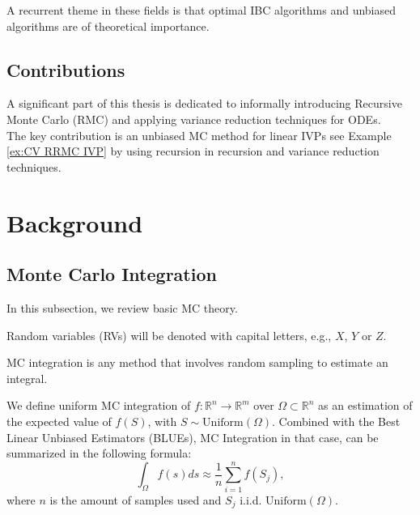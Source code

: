 \documentclass[a4paper,12pt]{article}
\begin{document}
A recurrent theme in these fields is that optimal IBC
algorithms and unbiased algorithms
are of theoretical importance.

\subsection{Contributions}

A significant part of this thesis is dedicated to
informally introducing Recursive Monte Carlo (RMC)
and applying variance reduction techniques for ODEs. \\

The key contribution is an unbiased MC method
for linear IVPs see Example \ref{ex:CV RRMC IVP}
by using recursion in recursion
and variance reduction techniques.

\section{Background}

\subsection{Monte Carlo Integration}

In this subsection, we review basic MC theory. \\

\begin{notation}
    Random variables (RVs) will be denoted with capital letters, e.g., $X$, $Y$ or $Z$.
\end{notation}


MC integration is any method that involves random sampling to
estimate an integral.
\begin{definition}
    We define uniform MC integration of
    $f:\mathbb{R}^{n} \rightarrow \mathbb{R}^{m}$
    over $\Omega \subset \mathbb{R}^{n}$ as
    an estimation of the expected value of $f(S)$, with
    $S \sim \text{Uniform}(\Omega)$. Combined
    with the Best Linear Unbiased Estimators (BLUEs), MC Integration
    in that case, can be summarized in the following formula:
    \begin{equation}\label{eq:BLUE}
        \int_{\Omega} f(s)ds \approx \frac{1}{n} \sum_{i=1}^{n}f(S_{j}),
    \end{equation}
    where $n$ is the amount of samples used and $S_{j}$ i.i.d. $\text{Uniform}(\Omega)$.
\end{definition}
\end{document}
